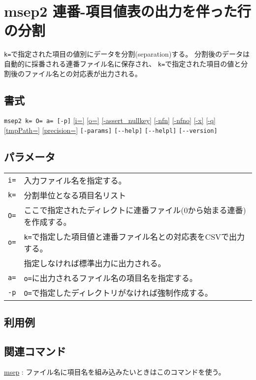 
%

\section{msep2 連番-項目値表の出力を伴った行の分割\label{sect:msep2}}
\verb|k=|で指定された項目の値別にデータを分割(separation)する。
分割後のデータは自動的に採番される連番ファイル名に保存され、
\verb|k=|で指定された項目の値と分割後のファイル名との対応表が出力される。

\subsection*{書式}
\verb|msep2 k= O= a= [-p]|
\hyperref[sect:option_i]{[i=]}
\hyperref[sect:option_o]{[o=]}
\hyperref[sect:option_assert_nullkey]{[-assert\_nullkey]}
\hyperref[sect:option_nfn]{[-nfn]} 
\hyperref[sect:option_nfno]{[-nfno]}  
\hyperref[sect:option_x]{[-x]}
\hyperref[sect:option_q]{[-q]}
\hyperref[sect:option_option_tmppath]{[tmpPath=]}
\hyperref[sect:option_precision]{[precision=]}
\verb|[-params]|
\verb|[--help]|
\verb|[--helpl]|
\verb|[--version]|\\

\subsection*{パラメータ}
\begin{table}[htbp]
{\small
\begin{tabular}{ll}
\verb|i=|    & 入力ファイル名を指定する。\\
\verb|k=|    & 分割単位となる項目名リスト\\
\verb|O=|    & ここで指定されたディレクトに連番ファイル(0から始まる連番)を作成する。\\
\verb|o=|    & \verb|k=|で指定した項目値と連番ファイル名との対応表をCSVで出力する。\\
             & 指定しなければ標準出力に出力される。\\
\verb|a=|    & \verb|o=|に出力されるファイル名の項目名を指定する。\\
\verb|-p|    & \verb|O=|で指定したディレクトリがなければ強制作成する。\\

\end{tabular} 
}
\end{table} 


\subsection*{利用例}

\subsection*{関連コマンド}
\hyperref[sect:msep] {msep} : ファイル名に項目名を組み込みたいときはこのコマンドを使う。

%
